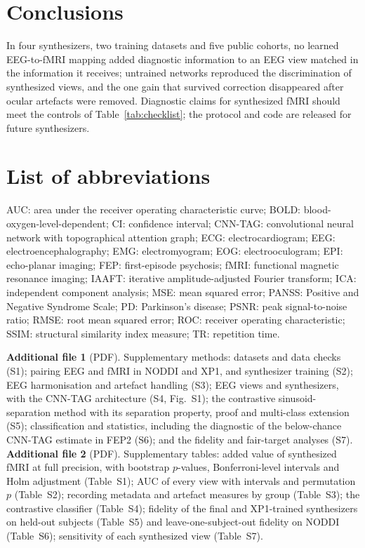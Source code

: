 \documentclass[pdflatex,referee,sn-basic]{sn-jnl}%
\begin{document}
\section{Conclusions}\label{section:conclusion}

In four synthesizers, two training datasets and five public cohorts, no learned EEG-to-fMRI mapping added diagnostic information to an EEG view matched in the information it receives; untrained networks reproduced the discrimination of synthesized views, and the one gain that survived correction disappeared after ocular artefacts were removed. Diagnostic claims for synthesized fMRI should meet the controls of Table~\ref{tab:checklist}; the protocol and code are released for future synthesizers.

\section*{List of abbreviations}
AUC: area under the receiver operating characteristic curve; BOLD: blood-oxygen-level-dependent; CI: confidence interval; CNN-TAG: convolutional neural network with topographical attention graph; ECG: electrocardiogram; EEG: electroencephalography; EMG: electromyogram; EOG: electrooculogram; EPI: echo-planar imaging; FEP: first-episode psychosis; fMRI: functional magnetic resonance imaging; IAAFT: iterative amplitude-adjusted Fourier transform; ICA: independent component analysis; MSE: mean squared error; PANSS: Positive and Negative Syndrome Scale; PD: Parkinson's disease; PSNR: peak signal-to-noise ratio; RMSE: root mean squared error; ROC: receiver operating characteristic; SSIM: structural similarity index measure; TR: repetition time.

\backmatter

\textbf{Additional file 1} (PDF). Supplementary methods: datasets and data checks (S1); pairing EEG and fMRI in NODDI and XP1, and synthesizer training (S2); EEG harmonisation and artefact handling (S3); EEG views and synthesizers, with the CNN-TAG architecture (S4, Fig.~S1); the contrastive sinusoid-separation method with its separation property, proof and multi-class extension (S5); classification and statistics, including the diagnostic of the below-chance CNN-TAG estimate in FEP2 (S6); and the fidelity and fair-target analyses (S7). \textbf{Additional file 2} (PDF). Supplementary tables: added value of synthesized fMRI at full precision, with bootstrap $p$-values, Bonferroni-level intervals and Holm adjustment (Table~S1); AUC of every view with intervals and permutation $p$ (Table~S2); recording metadata and artefact measures by group (Table~S3); the contrastive classifier (Table~S4); fidelity of the final and XP1-trained synthesizers on held-out subjects (Table~S5) and leave-one-subject-out fidelity on NODDI (Table~S6); sensitivity of each synthesized view (Table~S7).
\end{document}
